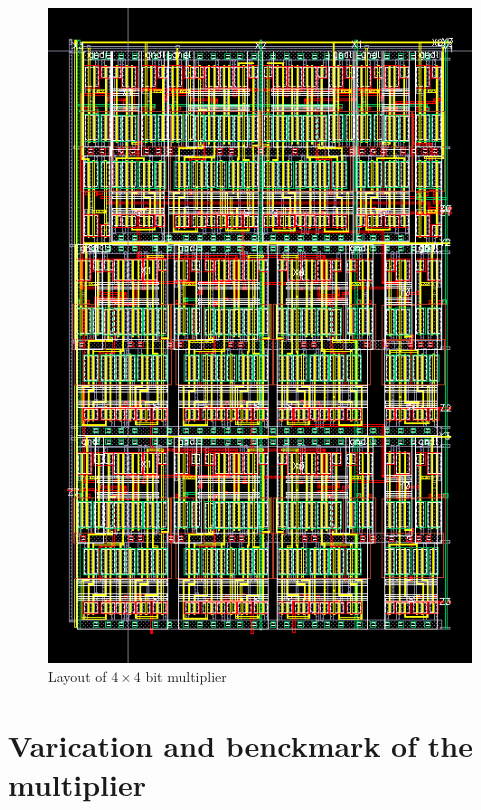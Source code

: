 \documentclass[conference]{IEEEtran}
\begin{document}
\begin{figure}[H]
    \centering
    \includegraphics[width=0.9\linewidth]{4X4_Multiplier_layout.png}
    \caption{Layout of $4 \times 4$ bit multiplier}
    \label{4X4_Multiplier_layout}
\end{figure}

\section{Varication and benckmark of the multiplier}
\label{test}

\end{document}
